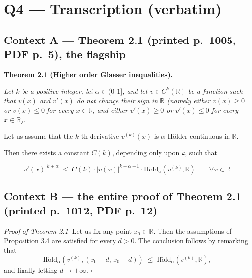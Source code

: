 \documentclass[11pt]{article}
\newcommand{\Hold}{\mathrm{H\ddot{o}ld}}
\begin{document}
\section*{Q4 --- Transcription (verbatim)}

\subsection*{Context A --- Theorem 2.1 (printed p.~1005, PDF p.~5), the flagship}

\textbf{Theorem 2.1 (Higher order Glaeser inequalities).} {\itshape
Let $k$ be a positive integer, let
$\alpha \in (0,1]$, and let $v \in C^k(\mathbb{R})$ be a function such that $v(x)$ and $v'(x)$ do
not change their sign in $\mathbb{R}$ (namely either $v(x) \ge 0$ or $v(x) \le 0$ for every
$x \in \mathbb{R}$, and either $v'(x) \ge 0$ or $v'(x) \le 0$ for every $x \in \mathbb{R}$).

Let us assume that the $k$-th derivative $v^{(k)}(x)$ is $\alpha$-H\"older continuous in
$\mathbb{R}$.

Then there exists a constant $C(k)$, depending only upon $k$, such that
}
\begin{equation}
|v'(x)|^{k+\alpha} \;\le\; C(k)\cdot|v(x)|^{k+\alpha-1}\cdot \Hold_\alpha\!\left(v^{(k)},\mathbb{R}\right)
\qquad \forall x \in \mathbb{R}. \tag{2.3}
\end{equation}

\subsection*{Context B --- the entire proof of Theorem 2.1 (printed p.~1012, PDF p.~12)}

\emph{Proof of Theorem 2.1.} Let us fix any point $x_0 \in \mathbb{R}$. Then the assumptions of
Proposition 3.4 are satisfied for every $d>0$. The conclusion follows by remarking that
\[
\Hold_\alpha\!\left(v^{(k)},(x_0-d,\,x_0+d)\right) \;\le\; \Hold_\alpha\!\left(v^{(k)},\mathbb{R}\right),
\]
and finally letting $d \to +\infty$. \hfill$\square$
\end{document}
